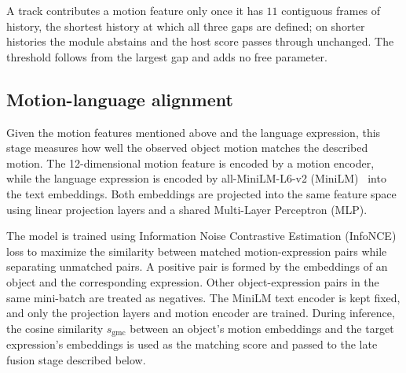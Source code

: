 \documentclass{article}
\begin{document}
A track contributes a motion feature only once it has $11$ contiguous frames of history, the shortest history at which all three gaps are defined; on shorter histories the module abstains and the host score passes through unchanged. The threshold follows from the largest gap and adds no free parameter.

\subsection{Motion-language alignment}
\label{sec:align}
Given the motion features mentioned above and the language expression, this stage measures how well the observed object motion matches the described motion. The 12-dimensional motion feature is encoded by a motion encoder, while the language expression is encoded by all-MiniLM-L6-v2 (MiniLM)~\cite{sbert} into the text embeddings. Both embeddings are projected into the same feature space using linear projection layers and a shared Multi-Layer Perceptron (MLP).

The model is trained using Information Noise Contrastive Estimation (InfoNCE)~\cite{infonce} loss to maximize the similarity between matched motion-expression pairs while separating unmatched pairs. A positive pair is formed by the embeddings of an object and the corresponding expression. Other object-expression pairs in the same mini-batch are treated as negatives. The MiniLM text encoder is kept fixed, and only the projection layers and motion encoder are trained. During inference, the cosine similarity $s_{\mathrm{gmc}}$ between an object's motion embeddings and the target expression's embeddings is used as the matching score and passed to the late fusion stage described below.
\end{document}

